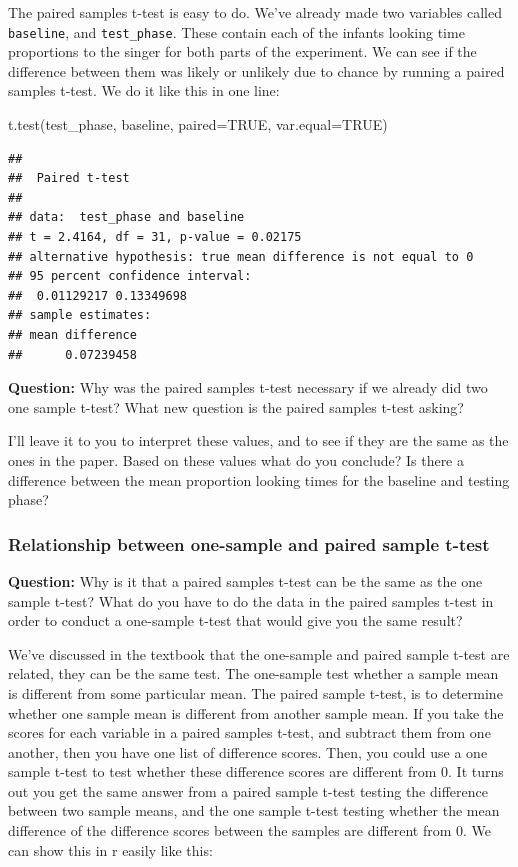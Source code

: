 \documentclass[
]{book}
\newenvironment{Shaded}{\begin{snugshade}}{\end{snugshade}}
\newcommand{\AttributeTok}[1]{\textcolor[rgb]{0.77,0.63,0.00}{#1}}
\newcommand{\ConstantTok}[1]{\textcolor[rgb]{0.00,0.00,0.00}{#1}}
\newcommand{\FunctionTok}[1]{\textcolor[rgb]{0.00,0.00,0.00}{#1}}
\newcommand{\NormalTok}[1]{#1}
\begin{document}
The paired samples t-test is easy to do. We've already made two variables called \texttt{baseline}, and \texttt{test\_phase}. These contain each of the infants looking time proportions to the singer for both parts of the experiment. We can see if the difference between them was likely or unlikely due to chance by running a paired samples t-test. We do it like this in one line:

\begin{Shaded}
\begin{Highlighting}[]
\FunctionTok{t.test}\NormalTok{(test\_phase, baseline, }\AttributeTok{paired=}\ConstantTok{TRUE}\NormalTok{, }\AttributeTok{var.equal=}\ConstantTok{TRUE}\NormalTok{)}
\end{Highlighting}
\end{Shaded}

\begin{verbatim}
## 
##  Paired t-test
## 
## data:  test_phase and baseline
## t = 2.4164, df = 31, p-value = 0.02175
## alternative hypothesis: true mean difference is not equal to 0
## 95 percent confidence interval:
##  0.01129217 0.13349698
## sample estimates:
## mean difference 
##      0.07239458
\end{verbatim}

\textbf{Question:} Why was the paired samples t-test necessary if we already did two one sample t-test? What new question is the paired samples t-test asking?

I'll leave it to you to interpret these values, and to see if they are the same as the ones in the paper. Based on these values what do you conclude? Is there a difference between the mean proportion looking times for the baseline and testing phase?

\hypertarget{relationship-between-one-sample-and-paired-sample-t-test}{%
\subsubsection{Relationship between one-sample and paired sample t-test}\label{relationship-between-one-sample-and-paired-sample-t-test}}

\textbf{Question:} Why is it that a paired samples t-test can be the same as the one sample t-test? What do you have to do the data in the paired samples t-test in order to conduct a one-sample t-test that would give you the same result?

We've discussed in the textbook that the one-sample and paired sample t-test are related, they can be the same test. The one-sample test whether a sample mean is different from some particular mean. The paired sample t-test, is to determine whether one sample mean is different from another sample mean. If you take the scores for each variable in a paired samples t-test, and subtract them from one another, then you have one list of difference scores. Then, you could use a one sample t-test to test whether these difference scores are different from 0. It turns out you get the same answer from a paired sample t-test testing the difference between two sample means, and the one sample t-test testing whether the mean difference of the difference scores between the samples are different from 0. We can show this in r easily like this:
\end{document}
